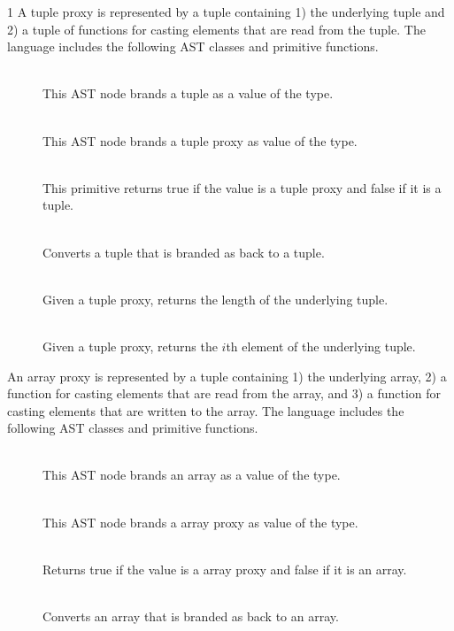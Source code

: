 \documentclass[7x10]{TimesAPriori_MIT}%
\def\pythonEd{1}
\def\edition{0}
\numberwithin{theorem}{chapter}
\numberwithin{definition}{chapter}
\numberwithin{equation}{chapter}
\begin{document}
{\if\edition\pythonEd
%
A tuple proxy is represented by a tuple containing 1) the underlying
tuple and 2) a tuple of functions for casting elements that are read
from the tuple. The \LangPVec{} language includes the following AST
classes and primitive functions.

\begin{description}
\item[] \ \\
%
  This AST node brands a tuple as a value of the \PTUPLETYNAME{} type.
\item[]\ \\
%
  This AST node brands a tuple proxy as value of the \PTUPLETYNAME{} type.
\item[]\ \\
%
  This primitive returns true if the value is a tuple proxy and false
  if it is a tuple.
\item[]\ \\
%
  Converts a tuple that is branded as \PTUPLETYNAME{}
  back to a tuple.
  
\item[]\ \\
%
  Given a tuple proxy, returns the length of the underlying tuple.
  
\item[]\ \\
%
  Given a tuple proxy, returns the $i$th element of the underlying
  tuple.
  
\end{description}

An array proxy is represented by a tuple containing 1) the underlying
array, 2) a function for casting elements that are read from the
array, and 3) a function for casting elements that are written to the
array.  The \LangPVec{} language includes the following AST classes
and primitive functions.

\begin{description}
\item[]\ \\
  This AST node brands an array as a value of the \PARRAYTYNAME{} type.

\item[]\ \\
%
  This AST node brands a array proxy as value of the \PARRAYTYNAME{} type.
\item[]\ \\
%
  Returns true if the value is a array proxy and false if it is an
  array.
\item[]\ \\
%
  Converts an array that is branded as \PARRAYTYNAME{} back to an
  array.
  

\end{description}}
\end{document}
